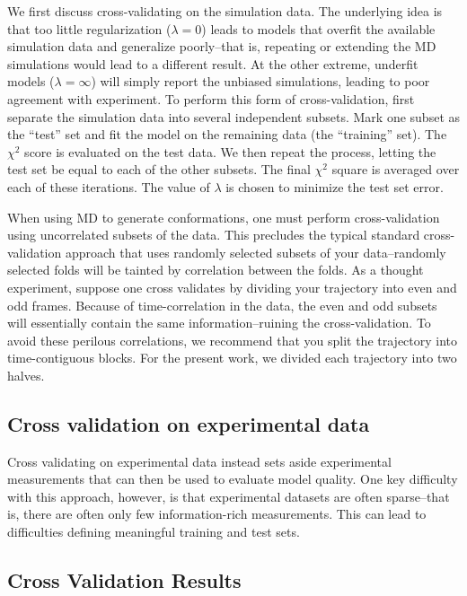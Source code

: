 \documentclass[12pt]{article}
\begin{document}
We first discuss cross-validating on the simulation data.  The underlying idea is that too little regularization ($\lambda = 0$) leads to models that overfit the available simulation data and generalize poorly--that is, repeating or extending the MD simulations would lead to a different result.  At the other extreme, underfit models ($\lambda = \infty$) will simply report the unbiased simulations, leading to poor agreement with experiment.  To perform this form of cross-validation, first separate the simulation data into several independent subsets.  Mark one subset as the ``test'' set and fit the model on the remaining data (the ``training'' set).  The $\chi^2$ score is evaluated on the test data.  We then repeat the process, letting the test set be equal to each of the other subsets.  The final $\chi^2$ square is averaged over each of these iterations.  The value of $\lambda$ is chosen to minimize the test set error.

When using MD to generate conformations, one must perform cross-validation using uncorrelated subsets of the data.  This precludes the typical standard cross-validation approach that uses randomly selected subsets of your data--randomly selected folds will be tainted by correlation between the folds.  As a thought experiment, suppose one cross validates by dividing your trajectory into even and odd frames.  Because of time-correlation in the data, the even and odd subsets will essentially contain the same information--ruining the cross-validation.  To avoid these perilous correlations, we recommend that you split the trajectory into time-contiguous blocks.  For the present work, we divided each trajectory into two halves.  

\subsection*{Cross validation on experimental data}

Cross validating on experimental data instead sets aside experimental measurements that can then be used to evaluate model quality.  One key difficulty with this approach, however, is that experimental datasets are often sparse--that is, there are often only few information-rich measurements.  This can lead to difficulties defining meaningful training and test sets.  

\subsection*{Cross Validation Results}
\end{document}
